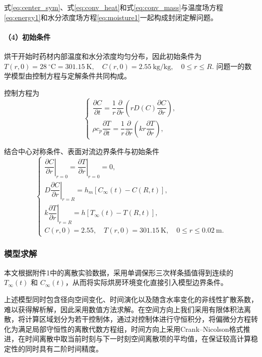 \documentclass[12pt,a4paper]{article}
\begin{document}
式\eqref{eq:center_sym}、式\eqref{eq:conv_heat}和式\eqref{eq:conv_mass}与温度场方程\eqref{eq:energy1}和水分浓度场方程\eqref{eq:moisture1}一起构成封闭定解问题。

\paragraph{（4）初始条件}

烘干开始时药材内部温度和水分浓度均匀分布，因此初始条件为
$T(r,0)=28\ ^\circ\mathrm{C}=301.15\ \mathrm{K},\quad C(r,0)=2.55\ \mathrm{kg/kg},\quad 0\le r\le R.$
问题一的数学模型由控制方程与定解条件共同构成。

控制方程为
\begin{equation}
\begin{cases}
\dfrac{\partial C}{\partial t}
=\dfrac{1}{r}\dfrac{\partial}{\partial r}
\left(rD(C)\dfrac{\partial C}{\partial r}\right),\\[3mm]
\rho c_p\dfrac{\partial T}{\partial t}
=\dfrac{1}{r}\dfrac{\partial}{\partial r}
\left(kr\dfrac{\partial T}{\partial r}\right),
\end{cases}
\label{eq:model1_pde}
\end{equation}

结合中心对称条件、表面对流边界条件与初始条件
\begin{equation}
\begin{cases}
\left.\dfrac{\partial C}{\partial r}\right|_{r=0}
=\left.\dfrac{\partial T}{\partial r}\right|_{r=0}=0,\\[3mm]
D\left.\dfrac{\partial C}{\partial r}\right|_{r=R}
=h_m\left[C_\infty(t)-C(R,t)\right],\\[3mm]
k\left.\dfrac{\partial T}{\partial r}\right|_{r=R}
=h\left[T_\infty(t)-T(R,t)\right],\\[3mm]
C(r,0)=2.55,\quad
T(r,0)=301.15\ \mathrm{K},\quad
0\le r\le0.02\ \mathrm{m}.
\end{cases}
\label{eq:model1_bc}
\end{equation}

\subsubsection{模型求解}
本文根据附件1中的离散实验数据，采用单调保形三次样条插值得到连续的 \(T_\infty(t)\) 和 \(C_\infty(t)\)，从而将实际烘房环境变化直接引入模型边界条件。

上述模型同时包含径向空间变化、时间演化以及随含水率变化的非线性扩散系数，难以获得解析解，因此采用数值方法求解。在空间方向上我们采用有限体积法离散，将计算区域划分为若干控制体，通过对控制体进行守恒积分，将偏微分方程转化为满足局部守恒性的离散代数方程组\cite{LemusMondaca2013}，时间方向上采用Crank--Nicolson格式推进，在时间离散中取当前时刻与下一时刻空间离散项的平均值，在保证较高计算稳定性的同时具有二阶时间精度\cite{Ali2026}。
\end{document}
